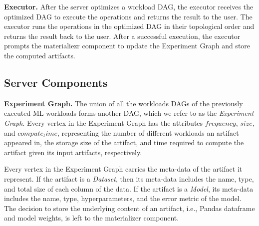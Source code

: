\textbf{Executor. }
After the server optimizes a workload DAG, the executor receives the optimized DAG to execute the operations and returns the result to the user.
The executor runs the operations in the optimized DAG in their topological order and returns the result back to the user.
After a successful execution, the executor prompts the materialiezr component to update the Experiment Graph and store the computed artifacts.
%

\subsection{Server Components}
\textbf{Experiment Graph.}
The union of all the workloads DAGs of the previously executed ML workloads forms another DAG, which we refer to as the \textit{Experiment Graph}.
Every vertex in the Experiment Graph has the attributes $frequency$, $size$, and $compute_time$, representing the number of different workloads an artifact appeared in, the storage size of the artifact, and time required to compute the artifact given its input artifacts, respectively.

Every vertex in the Experiment Graph carries the meta-data of the artifact it represent.
If the artifact is a \textit{Dataset}, then its meta-data includes the name, type, and total size of each column of the data.
If the artifact is a \textit{Model}, its meta-data includes the name, type, hyperparameters, and the error metric of the model.
The decision to store the underlying content of an artifact, i.e., Pandas dataframe and model weights, is left to the materializer component.

